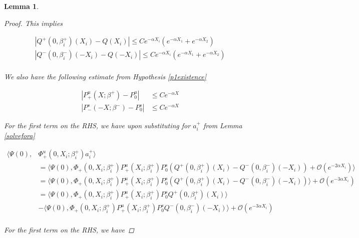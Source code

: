 \documentclass[12pt]{article}
\newtheorem{lemma}{Lemma}
\begin{document}
\begin{lemma}
\begin{proof}
This implies

\begin{align*}
|Q^+(0, \beta_i^+)(X_i) - Q(X_i)| \leq C e^{-\alpha X_i} (e^{-\alpha X_1} + e^{-\alpha X_2}) \\
|Q^-(0, \beta_i^-)(-X_i) - Q(-X_i)| \leq C e^{-\alpha X_i} (e^{-\alpha X_1} + e^{-\alpha X_2}) \\
\end{align*}

We also have the following estimate from Hypothesis \ref{p1existence}

\begin{align*}
|P^u_+(X; \beta^+) - P_0^u| &\leq C e^{-\alpha X} \\
|P^s_-(-X; \beta^-) - P_0^s| &\leq C e^{-\alpha X}
\end{align*}

For the first term on the RHS, we have upon substituting for $a_i^+$ from Lemma \ref{solvefora}

\begin{align*}
\langle \Psi(0), &\Phi^u_+(0, X_i; \beta_i^+) a_i^+ \rangle \\
&= \langle \Psi(0), \Phi_+(0, X_i; \beta_i^+) P^u_+(X_i; \beta_i^+) P^s_0 \left( Q^+(0, \beta_i^+)(X_i) - Q^-(0, \beta_i^-)(-X_i) \right) 
+ \mathcal{O}( e^{-2 \alpha X_i} ) \rangle \\
&= \langle \Psi(0), \Phi_+(0, X_i; \beta_i^+) P^u_+(X_i; \beta_i^+) P^s_0 \left( Q^+(0, \beta_i^+)(X_i) - Q^-(0, \beta_i^-)(-X_i) \right) \rangle  
+ \mathcal{O}( e^{-3 \alpha X_i} ) \\
&= \langle \Psi(0), \Phi_+(0, X_i; \beta_i^+) P^u_+(X_i; \beta_i^+) P^s_0 Q^+(0, \beta_i^+)(X_i) \rangle \\
&- \langle \Psi(0), \Phi_+(0, X_i; \beta_i^+) P^u_+(X_i; \beta_i^+) P^s_0 Q^-(0, \beta_i^-)(-X_i) \rangle
+ \mathcal{O}( e^{-3 \alpha X_i} ) \\
\end{align*}

For the first term on the RHS, we have


\end{proof}
\end{lemma}
\end{document}
